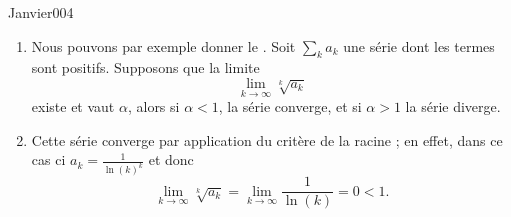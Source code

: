 \begin{corrige}{Janvier004}


\begin{enumerate}
  \item
Nous pouvons par exemple donner le .
 Soit $\sum_k a_k$ une série dont les termes sont
  positifs. Supposons que la limite
  \begin{equation*}
    \lim_{k \to \infty} \sqrt[k]{a_k}
  \end{equation*}
  existe et vaut $\alpha$, alors si $\alpha < 1$, la
  série converge, et si $\alpha > 1$ la série diverge.


\item Cette série converge par application du critère de la racine ;
  en effet, dans ce cas ci $a_k = \frac 1 {\ln(k)^k}$ et donc
  \begin{equation*}
    \lim_{k\to\infty} \sqrt[k]{a_k} = \lim_{k\to\infty} \frac 1
    {\ln(k)} = 0 < 1.
  \end{equation*}
\end{enumerate}

\end{corrige}
